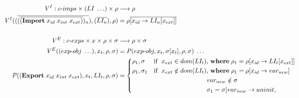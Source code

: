 \documentclass[sigplan,screen,anonymous]{acmart}
\def\dash {\text{-}}
\begin{document}
\newcommand{\runio}[1]{run\dash prog(#1, \rho, \sigma)\;}
\newcommand{\prog}[2]{(\textbf{program}\; (\textbf{use\dash linklets}\;#1 )\;#2)}
\def\transrel {&\twoheadrightarrow_{p}\;}

\begin{figure*}[tbp]
  \begin{align*}
    \mathit{V}^I : c\dash imps \times (LI\;\ldots) \times \rho &\longrightarrow \rho \\
    \mathit{V}^I((\overline{(\overline{(\textbf{Import}\; x_{id}\;x_{int}\;x_{ext})})_n}), (\overline{LI_n}), \rho) &= \rho\overline{[x_{id}\rightarrow LI_n[x_{ext}]]}\\ \\
    \mathit{V}^E : c\dash exps \times x \times \rho \times \sigma &\longrightarrow \rho \times \sigma \\
    \mathit{V}^E((exp\dash obj\;\ldots), x_t, \rho, \sigma) &= \mathit{P}(exp\dash obj, x_t, \sigma[x_t], \rho, \sigma)\;\ldots\\
    \mathit{P}((\textbf{Export}\;x_{id}\;x_{int}\;x_{ext}), x_t, LI_t, \rho, \sigma) &= \begin{cases*}
      \rho_1, \sigma & if $\;x_{ext} \in dom(LI_t)$, \where $\rho_1 = \rho[x_{id}\rightarrow LI_t[x_{ext}]]$ \\
      \rho_1, \sigma_1 & if $\;x_{ext} \notin dom(LI_t)$, \where $\rho_1 = \rho[x_{id}\rightarrow var_{new}]$\\
      \;        &\; \hspace{2.6cm} $var_{new} \notin \sigma$ \\
      \;        &\; \hspace{2.6cm} $\sigma_1 = \sigma[var_{new}\rightarrow uninit,$ \\

\end{cases*}
\end{align*}
\end{figure*}
\end{document}
